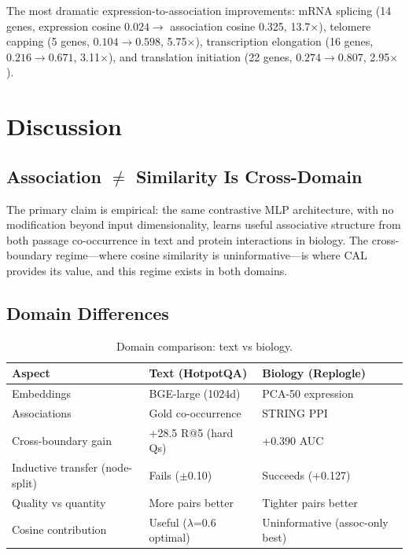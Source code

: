 \documentclass[11pt]{article}
\begin{document}
The most dramatic expression-to-association improvements: mRNA splicing (14 genes, expression cosine $0.024 \to$ association cosine 0.325, 13.7$\times$), telomere capping (5 genes, $0.104 \to 0.598$, 5.75$\times$), transcription elongation (16 genes, $0.216 \to 0.671$, 3.11$\times$), and translation initiation (22 genes, $0.274 \to 0.807$, 2.95$\times$).

\section{Discussion}
\label{sec:discussion}

\subsection{Association $\neq$ Similarity Is Cross-Domain}

The primary claim is empirical: the same contrastive MLP architecture, with no modification beyond input dimensionality, learns useful associative structure from both passage co-occurrence in text and protein interactions in biology. The cross-boundary regime---where cosine similarity is uninformative---is where CAL provides its value, and this regime exists in both domains.

\subsection{Domain Differences}

\begin{table}[h]
\centering
\caption{Domain comparison: text vs biology.}
\label{tab:domains}
\begin{tabular}{lll}
\toprule
Aspect & Text (HotpotQA) & Biology (Replogle) \\
\midrule
Embeddings & BGE-large (1024d) & PCA-50 expression \\
Associations & Gold co-occurrence & STRING PPI \\
Cross-boundary gain & +28.5 R@5 (hard Qs) & +0.390 AUC \\
Inductive transfer (node-split) & Fails ($\pm$0.10) & Succeeds (+0.127) \\
Quality vs quantity & More pairs better & Tighter pairs better \\
Cosine contribution & Useful ($\lambda$=0.6 optimal) & Uninformative (assoc-only best) \\
\bottomrule
\end{tabular}
\end{table}
\end{document}
